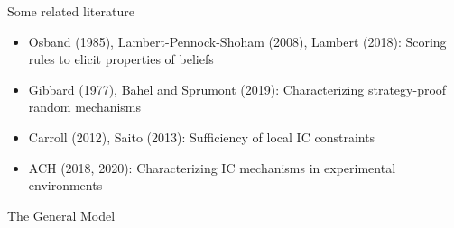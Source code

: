 \begin{frame}{Some related literature}{}


\begin{itemize}
\item Osband (1985), Lambert-Pennock-Shoham (2008), Lambert (2018): Scoring rules to elicit properties of beliefs

\bigskip

\item Gibbard (1977), Bahel and Sprumont (2019): Characterizing strategy-proof random mechanisms

\bigskip

\item Carroll (2012), Saito (2013): Sufficiency of local IC constraints

\bigskip

\item ACH (2018, 2020): Characterizing IC mechanisms in experimental environments

\end{itemize}

\end{frame}



\begin{frame}
  \vfill
  \centerline{\Large{The General Model}}
  \vfill
\end{frame}


